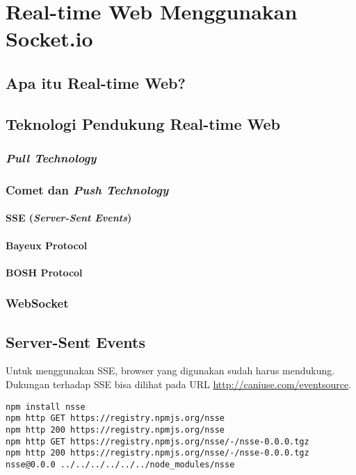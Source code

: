 \chapter{Real-time Web Menggunakan Socket.io}

\section{Apa itu Real-time Web?}

\section{Teknologi Pendukung Real-time Web}

\subsection{\textit{Pull Technology}}

\subsection{Comet dan \textit{Push Technology}}

\subsubsection{SSE (\textit{Server-Sent Events})}

\subsubsection{Bayeux Protocol}

\subsubsection{BOSH Protocol}

\subsection{WebSocket}

\section{Server-Sent Events}

Untuk menggunakan SSE, browser yang digunakan sudah harus mendukung. Dukungan terhadap SSE bisa dilihat pada URL \url{http://caniuse.com/eventsource}.
\lstset{language=Bash,caption=Instalasi sse}
\begin{lstlisting}
npm install nsse
npm http GET https://registry.npmjs.org/nsse
npm http 200 https://registry.npmjs.org/nsse
npm http GET https://registry.npmjs.org/nsse/-/nsse-0.0.0.tgz
npm http 200 https://registry.npmjs.org/nsse/-/nsse-0.0.0.tgz
nsse@0.0.0 ../../../../../../node_modules/nsse
\end{lstlisting}



